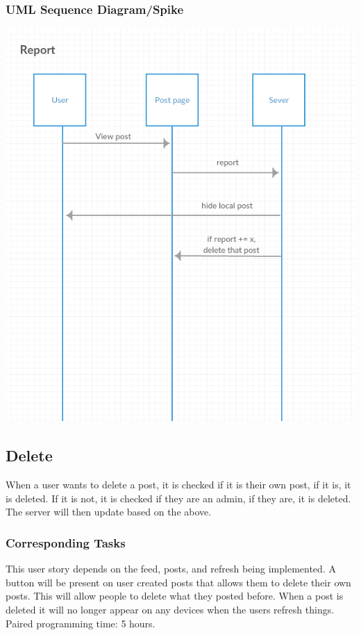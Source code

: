 \documentclass[12pt]{article}
\begin{document}
\subsubsection{UML Sequence Diagram/Spike}
\includegraphics[scale=0.5]{img/4.png}\linebreak

\subsection{Delete}
When a user wants to delete a post, it is checked if it is their own post, if it
is, it is deleted. If it is not, it is checked if they are an admin, if they
are, it is deleted. The server will then update based on the above.
\subsubsection{Corresponding Tasks}
	This user story depends on the feed, posts, and refresh being implemented.  A button will be present on user created posts that allows them to delete their own posts.  This will allow people to delete what they posted before.  When a post is deleted it will no longer appear on any devices when the users refresh things.  Paired programming time: 5 hours.
\end{document}
